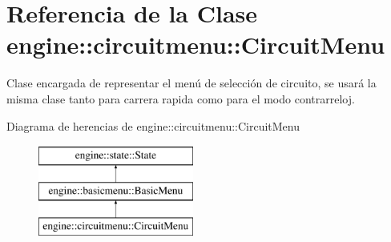 \hypertarget{classengine_1_1circuitmenu_1_1CircuitMenu}{
\section{\-Referencia de la \-Clase engine\-:\-:circuitmenu\-:\-:\-Circuit\-Menu}
\label{classengine_1_1circuitmenu_1_1CircuitMenu}
}


\-Clase encargada de representar el menú de selección de circuito, se usará la misma clase tanto para carrera rapida como para el modo contrarreloj.  


\-Diagrama de herencias de engine\-:\-:circuitmenu\-:\-:\-Circuit\-Menu\begin{figure}[H]
\begin{center}
\leavevmode
\includegraphics[height=3.000000cm]{classengine_1_1circuitmenu_1_1CircuitMenu}
\end{center}
\end{figure}
